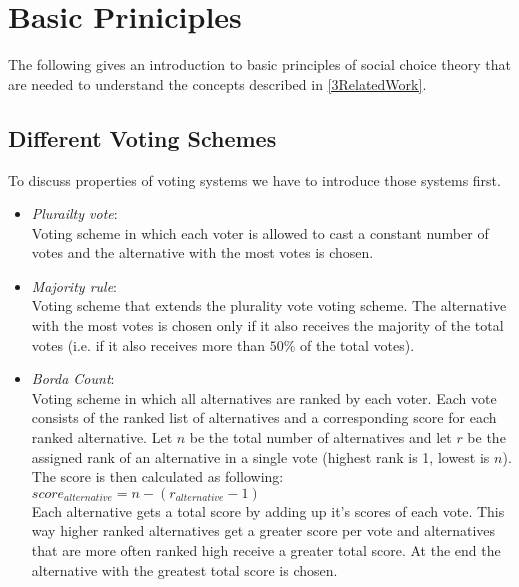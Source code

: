 \documentclass[conference]{IEEEtran}
\begin{document}
\section{Basic Priniciples}\label{2BasicPrinciples}
The following gives an introduction to basic principles of social choice theory that are needed to understand the concepts described in \ref{3RelatedWork}.
\subsection{Different Voting Schemes}
To discuss properties of voting systems we have to introduce those systems first.
\begin{itemize}
    \item \textit{Plurailty vote}:\\
    Voting scheme in which each voter is allowed to cast a constant number of votes and the alternative with the most votes is chosen.

    \item \textit{Majority rule}:\\
    Voting scheme that extends the plurality vote voting scheme. The alternative with the most votes is chosen only if it also receives the majority of the total votes (i.e. if it also receives more than $50\%$ of the total votes).

    \item \textit{Borda Count}:\\
    Voting scheme in which all alternatives are ranked by each voter. Each vote consists of the ranked list of alternatives and a corresponding score for each ranked alternative. Let $n$ be the total number of alternatives and let $r$ be the assigned rank of an alternative in a single vote (highest rank is 1, lowest is $n$). The score is then calculated as following:\\
    $score_{alternative}=n-(r_{alternative}-1)$\\
    Each alternative gets a total score by adding up it's scores of each vote. This way higher ranked alternatives get a greater score per vote and alternatives that are more often ranked high receive a greater total score. At the end the alternative with the greatest total score is chosen.
\end{itemize}

\end{document}
